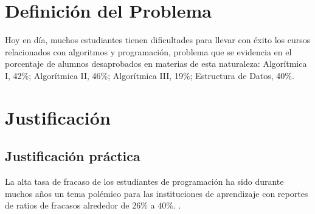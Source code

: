 \section{Definición del Problema}
 Hoy en día, muchos estudiantes tienen dificultades para llevar con éxito los cursos relacionados con algoritmos y programación, problema que se evidencia en el porcentaje de alumnos desaprobados en materias de esta naturaleza: Algorítmica I, 42\%; Algorítmica II, 46\%; Algorítmica III, 19\%; Estructura de Datos, 40\%.

\section{Justificación}
\subsection{Justificación práctica}
La alta tasa de fracaso de los estudiantes de programación ha sido durante muchos años un tema polémico para las instituciones de aprendizaje con reportes de ratios de fracasos alrededor de $26\%$ a $40\%$. \cite{sheard_our_1998,truong_web_2003,lang_seven_2007,han_enhancement_2010}.\\

